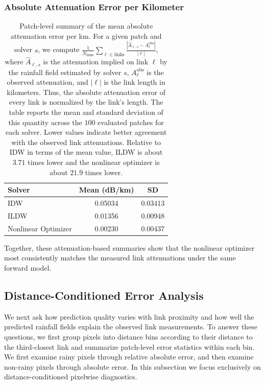 \documentclass[11pt]{article}
\begin{document}
\subsubsection{Absolute Attenuation Error per Kilometer}
\begin{table}[H]
  \centering
  \begin{tabular}{lcc}
    \toprule
    Solver & Mean (dB/km) & SD \\
    \midrule
    IDW & 0.05034 & 0.03413 \\
    ILDW & 0.01356 & 0.00948 \\
    Nonlinear Optimizer & 0.00230 & 0.00437 \\
    \bottomrule
  \end{tabular}
\caption{Patch-level summary of the mean absolute attenuation error per km. For a given patch and solver $s$, we compute $\frac{1}{N_{\mathrm{links}}}\sum_{\ell \in \mathrm{links}} \frac{\left|\hat{A}_{\ell,s} - A_\ell^{\mathrm{obs}}\right|}{|\ell|}$, where $\hat{A}_{\ell,s}$ is the attenuation implied on link $\ell$ by the rainfall field estimated by solver $s$, $A_\ell^{\mathrm{obs}}$ is the observed attenuation, and $|\ell|$ is the link length in kilometers. Thus, the absolute attenuation error of every link is normalized by the link's length. The table reports the mean and standard deviation of this quantity across the $100$ evaluated patches for each solver. Lower values indicate better agreement with the observed link attenuations. Relative to IDW in terms of the mean value, ILDW is about $3.71$ times lower and the nonlinear optimizer is about $21.9$ times lower.
  }
\end{table}

Together, these attenuation-based summaries show that the nonlinear optimizer most consistently matches the measured link attenuations under the same forward model.


\subsection{Distance-Conditioned Error Analysis}
We next ask how prediction quality varies with link proximity and how well the predicted rainfall fields explain the observed link measurements. To answer these questions, we first group pixels into distance bins according to their distance to the third-closest link and summarize patch-level error statistics within each bin. We first examine rainy pixels through relative absolute error, and then examine non-rainy pixels through absolute error. In this subsection we focus exclusively on distance-conditioned pixelwise diagnostics.
\end{document}
